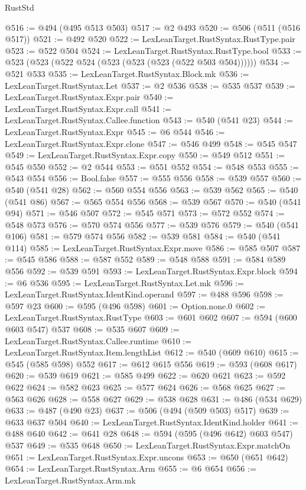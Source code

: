 \begin{lexlean}{RustStd}
\begin{coremodule}
@516 := @494 (@495 @513 @503)
@517 := @2 @493
@520 := @506 (@511 (@516 @517))
@521 := @492 @520
@522 := LexLeanTarget.RustSyntax.RustType.pair
@523 := @522 @504
@524 := LexLeanTarget.RustSyntax.RustType.bool
@533 := @523 (@523 (@522 @524 (@523 (@523 (@523 (@522 @503 @504))))))
@534 := @521 @533
@535 := LexLeanTarget.RustSyntax.Block.mk
@536 := LexLeanTarget.RustSyntax.Let
@537 := @2 @536
@538 := @535 @537
@539 := LexLeanTarget.RustSyntax.Expr.pair
@540 := LexLeanTarget.RustSyntax.Expr.call
@541 := LexLeanTarget.RustSyntax.Callee.function
@543 := @540 (@541 @23)
@544 := LexLeanTarget.RustSyntax.Expr
@545 := @6 @544
@546 := LexLeanTarget.RustSyntax.Expr.clone
@547 := @546 @499
@548 := @545 @547
@549 := LexLeanTarget.RustSyntax.Expr.copy
@550 := @549 @512
@551 := @545 @550
@552 := @2 @544
@553 := @551 @552
@554 := @548 @553
@555 := @543 @554
@556 := Bool.false
@557 := @555 @556
@558 := @539 @557
@560 := @540 (@541 @28)
@562 := @560 @554 @556
@563 := @539 @562
@565 := @540 (@541 @86)
@567 := @565 @554 @556
@568 := @539 @567
@570 := @540 (@541 @94)
@571 := @546 @507
@572 := @545 @571
@573 := @572 @552
@574 := @548 @573
@576 := @570 @574 @556
@577 := @539 @576
@579 := @540 (@541 @106)
@581 := @579 @574 @556
@582 := @539 @581
@584 := @540 (@541 @114)
@585 := LexLeanTarget.RustSyntax.Expr.move
@586 := @585 @507
@587 := @545 @586
@588 := @587 @552
@589 := @548 @588
@591 := @584 @589 @556
@592 := @539 @591
@593 := LexLeanTarget.RustSyntax.Expr.block
@594 := @6 @536
@595 := LexLeanTarget.RustSyntax.Let.mk
@596 := LexLeanTarget.RustSyntax.IdentKind.operand
@597 := @488 @596
@598 := @597 @23
@600 := @595 (@496 @598)
@601 := Option.none.{0}
@602 := LexLeanTarget.RustSyntax.RustType
@603 := @601 @602
@607 := @594 (@600 @603 @547) @537
@608 := @535 @607
@609 := LexLeanTarget.RustSyntax.Callee.runtime
@610 := LexLeanTarget.RustSyntax.Item.lengthList
@612 := @540 (@609 @610)
@615 := @545 (@585 @598) @552
@617 := @612 @615 @556
@619 := @593 (@608 @617)
@620 := @539 @619
@621 := @585 @499
@622 := @620 @621
@623 := @592 @622
@624 := @582 @623
@625 := @577 @624
@626 := @568 @625
@627 := @563 @626
@628 := @558 @627
@629 := @538 @628
@631 := @486 (@534 @629)
@633 := @487 (@490 @23)
@637 := @506 (@494 (@509 @503) @517)
@639 := @633 @637 @504
@640 := LexLeanTarget.RustSyntax.IdentKind.holder
@641 := @488 @640
@642 := @641 @28
@648 := @594 (@595 (@496 @642) @603 @547) @537
@649 := @535 @648
@650 := LexLeanTarget.RustSyntax.Expr.matchOn
@651 := LexLeanTarget.RustSyntax.Expr.uncons
@653 := @650 (@651 @642)
@654 := LexLeanTarget.RustSyntax.Arm
@655 := @6 @654
@656 := LexLeanTarget.RustSyntax.Arm.mk

\end{coremodule}
\end{lexlean}

